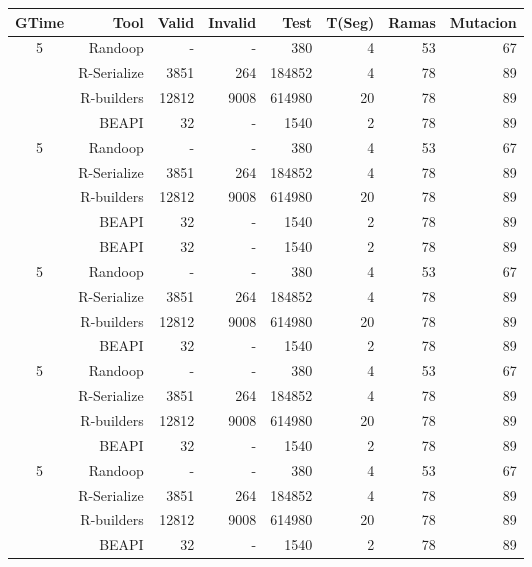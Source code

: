 \begin{table}[H]
\scriptsize
\centering
\label{tab:results-obj1}
\begin{tabular}{ c  r  |r | r | r|r|r|r  }
  \toprule
  \textbf{GTime} & \textbf{Tool} & \textbf{Valid}  & \textbf{Invalid} & \textbf{Test}&\textbf{T(Seg)} &\textbf{Ramas}  & \textbf{Mutacion} \\ 
  \midrule
5	&	Randoop	&	-	&	- & 380 & 4	& 53 & 67 \\
& R-Serialize	& 3851 & 264 & 184852 & 4	& 78 &	89 	\\
& R-builders	& 12812 & 9008 & 614980 & 20 &	78	& 89  \\
&	BEAPI & 32 & - & 1540 & 2	& 78 & 89 \\
\cline{2-8}
5	&	Randoop	&	-	&	- & 380 & 4	& 53 & 67 \\
& R-Serialize	& 3851 & 264 & 184852 & 4	& 78 &	89 	\\
& R-builders	& 12812 & 9008 & 614980 & 20 &	78	& 89  \\
&	BEAPI & 32 & - & 1540 & 2	& 78 & 89 \\
&BEAPI	&	32	&	- &1540&2&	78	&	89 \\
\cline{2-8}
5	&	Randoop	&	-	&	- & 380 & 4	& 53 & 67 \\
& R-Serialize	& 3851 & 264 & 184852 & 4	& 78 &	89 	\\
& R-builders	& 12812 & 9008 & 614980 & 20 &	78	& 89  \\
&	BEAPI & 32 & - & 1540 & 2	& 78 & 89 \\

\cline{2-8}
5	&	Randoop	&	-	&	- & 380 & 4	& 53 & 67 \\
& R-Serialize	& 3851 & 264 & 184852 & 4	& 78 &	89 	\\
& R-builders	& 12812 & 9008 & 614980 & 20 &	78	& 89  \\
&	BEAPI & 32 & - & 1540 & 2	& 78 & 89 \\
\cline{2-8}
5	&	Randoop	&	-	&	- & 380 & 4	& 53 & 67 \\
& R-Serialize	& 3851 & 264 & 184852 & 4	& 78 &	89 	\\
& R-builders	& 12812 & 9008 & 614980 & 20 &	78	& 89  \\
&	BEAPI & 32 & - & 1540 & 2	& 78 & 89 \\
\end{tabular}
\end{table}

